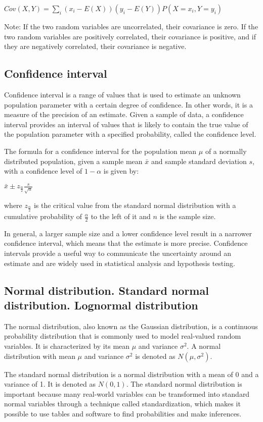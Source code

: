 \documentclass[12pt, a4paper, oneside]{article}
\begin{document}
$Cov(X, Y) = \sum_{i} (x_i - E(X))(y_i - E(Y))P(X = x_i, Y = y_i)$

Note: If the two random variables are uncorrelated, their covariance is zero. If the two random variables are positively correlated, their covariance is positive, and if they are negatively correlated, their covariance is negative.
\subsection{ Confidence interval }
Confidence interval is a range of values that is used to estimate an unknown population parameter with a certain degree of confidence. In other words, it is a measure of the precision of an estimate. Given a sample of data, a confidence interval provides an interval of values that is likely to contain the true value of the population parameter with a specified probability, called the confidence level.

The formula for a confidence interval for the population mean $\mu$ of a normally distributed population, given a sample mean $\bar{x}$ and sample standard deviation $s$, with a confidence level of $1 - \alpha$ is given by:

$\bar{x} \pm z_{\frac{\alpha}{2}} \frac{s}{\sqrt{n}}$

where $z_{\frac{\alpha}{2}}$ is the critical value from the standard normal distribution with a cumulative probability of $\frac{\alpha}{2}$ to the left of it and $n$ is the sample size.

In general, a larger sample size and a lower confidence level result in a narrower confidence interval, which means that the estimate is more precise. Confidence intervals provide a useful way to communicate the uncertainty around an estimate and are widely used in statistical analysis and hypothesis testing.
\subsection{ Normal distribution. Standard normal distribution. Lognormal distribution }
The normal distribution, also known as the Gaussian distribution, is a continuous probability distribution that is commonly used to model real-valued random variables. It is characterized by its mean $\mu$ and variance $\sigma^2$. A normal distribution with mean $\mu$ and variance $\sigma^2$ is denoted as $N(\mu, \sigma^2)$.

The standard normal distribution is a normal distribution with a mean of 0 and a variance of 1. It is denoted as $N(0, 1)$. The standard normal distribution is important because many real-world variables can be transformed into standard normal variables through a technique called standardization, which makes it possible to use tables and software to find probabilities and make inferences.
\end{document}
